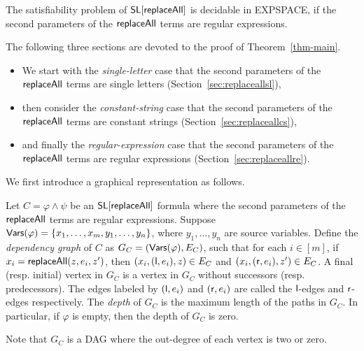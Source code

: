 \begin{theorem}\label{thm-main}
	The satisfiability problem of $\mathsf{SL}[\mathsf{replaceAll}]$ is decidable in EXPSPACE, if the second parameters of the $\mathsf{replaceAll}$ terms are regular expressions.  
\end{theorem}

The following three sections are devoted to the proof of Theorem~\ref{thm-main}.  
\begin{itemize}
\item We start with the \emph{single-letter} case that the second parameters of the $\mathsf{replaceAll}$ terms are single letters (Section~\ref{sec:replaceallsl}),
\item then consider the \emph{constant-string} case that the second parameters of the $\mathsf{replaceAll}$ terms are constant strings  (Section~\ref{sec:replaceallcs}), \item and finally the \emph{regular-expression} case that the second parameters of the $\mathsf{replaceAll}$ terms are regular expressions  (Section~\ref{sec:replaceallre}).
\end{itemize}




We first introduce a graphical representation as follows.    

\begin{definition}
	Let $C= \varphi \wedge \psi$ be an $\mathsf{SL}[\mathsf{replaceAll}]$ formula where the second parameters of the $\mathsf{replaceAll}$ terms are regular expressions. Suppose $\mathsf{Vars}(\varphi) = \{x_1,\dots, x_m, y_1, \dots, y_n\}$, where $y_1,\dots, y_n$ are  source variables. Define the \emph{dependency graph} of $C$ as $G_C= (\mathsf{Vars}(\varphi), E_C)$, such that for each $i \in [m]$, if $x_i = \mathsf{replaceAll}(z, e_i, z')$, then $(x_i, (\mathsf{l}, e_i), z) \in E_C$ and $(x_i, (\mathsf{r}, e_i), z') \in E_C$. A final (resp. initial) vertex in $G_C$ is a vertex in $G_C$ without successors (resp. predecessors). The edges labeled by $(\mathsf{l}, e_i)$ and $(\mathsf{r}, e_i)$ are called the $\mathsf{l}$-edges and $\mathsf{r}$-edges respectively. The \emph{depth} of $G_C$ is the maximum length of the paths in $G_C$. In particular, if $\varphi$ is empty, then the depth of $G_C$ is zero. 
\end{definition}
Note that $G_C$ is a DAG where the out-degree of each vertex is two or zero. 

